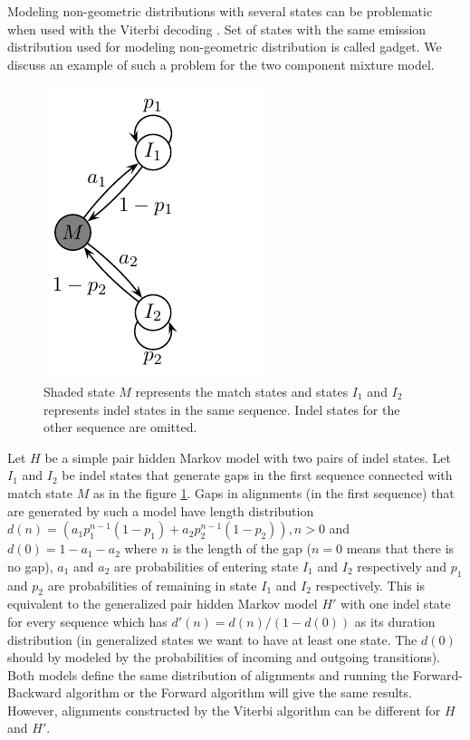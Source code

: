 Modeling non-geometric distributions with several states can be problematic when
used with the Viterbi decoding \cite{Vinar2005}. Set of states with the same
emission distribution used for modeling non-geometric distribution is called
gadget. We discuss an example of such a problem for the two component mixture
model.

\begin{figure}
\begin{center}
\includegraphics{../figures/twoComponentMixtureModel.pdf}
\end{center}
\caption[The example of an HMM modelin two component geometric distribution]{
Shaded state $M$ represents the match states and states $I_1$ and $I_2$
represents indel states in the same sequence. Indel states for the other
sequence are omitted.
}\label{FIGURE:TWOCOMPONENT}
\end{figure}

Let $H$ be a simple pair hidden Markov model with two pairs of indel states.
Let $I_1$ and $I_2$ be indel states that generate gaps in the first sequence
connected with match state $M$ as in the figure \ref{FIGURE:TWOCOMPONENT}.  Gaps
in alignments (in the first sequence) that are generated by such a model have
length distribution $d(n)=(a_1p_1^{n-1}(1-p_1)+a_2p_2^{n-1}(1-p_2)), n>0$ and
$d(0) = 1-a_1 - a_2$ where $n$ is the length of the gap ($n=0$ means that there
is no gap), $a_1$ and $a_2$ are probabilities of entering state $I_1$ and $I_2$
respectively and $p_1$ and $p_2$ are probabilities of remaining in state $I_1$
and $I_2$ respectively.  This is equivalent to the generalized pair hidden
Markov model $H'$ with one indel state for every sequence which has
$d'(n)=d(n)/(1-d(0))$ as its duration distribution (in generalized states we
want to have at least one state. The $d(0)$ should by modeled by the
probabilities of incoming and outgoing transitions). Both models define the same
distribution of alignments  and running the Forward-Backward algorithm or the
Forward algorithm will give the same results. However, alignments constructed by
the Viterbi algorithm can be different for $H$ and $H'$.

